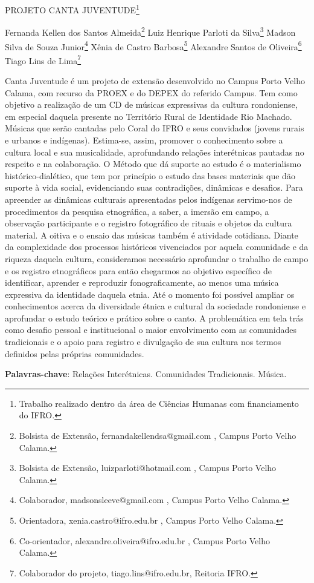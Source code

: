 \documentclass[article,12pt,onesidea,4paper,english,brazil]{abntex2}
\begin{document}
	
	
	\frenchspacing 
	
	\begin{center}
		\LARGE PROJETO CANTA JUVENTUDE\footnote{Trabalho realizado dentro da área de Ciências Humanas com financiamento do IFRO.}
		
		\normalsize
		Fernanda Kellen dos Santos Almeida\footnote{Bolsista de Extensão, fernandakellendsa@gmail.com , Campus Porto Velho Calama.} 
		Luiz Henrique Parloti da Silva\footnote{Bolsista de Extensão, luizparloti@hotmail.com , Campus Porto Velho Calama.} 
		Madson Silva de Souza Junior\footnote{Colaborador, madsonsleeve@gmail.com , Campus Porto Velho Calama.} 
		Xênia de Castro Barbosa\footnote{Orientadora, xenia.castro@ifro.edu.br , Campus Porto Velho Calama.} 
		Alexandre Santos de Oliveira\footnote{Co-orientador, alexandre.oliveira@ifro.edu.br , Campus Porto Velho Calama.}
		Tiago Lins de Lima\footnote{ Colaborador do projeto, tiago.lins@ifro.edu.br, Reitoria IFRO.}
	\end{center}
	
	\noindent Canta Juventude é um projeto de extensão desenvolvido no Campus Porto Velho Calama, com recurso da PROEX e do DEPEX do referido Campus. Tem como objetivo a realização de um CD de músicas expressivas da cultura rondoniense, em especial daquela presente no Território Rural de Identidade Rio Machado. Músicas que serão cantadas pelo Coral do IFRO e seus convidados (jovens rurais e urbanos e indígenas). Estima-se, assim, promover o conhecimento sobre a cultura local e sua musicalidade, aprofundando relações interétnicas pautadas no respeito e na colaboração. O Método que dá suporte ao estudo é o materialismo histórico-dialético, que tem por princípio o estudo das bases materiais que dão suporte à vida social, evidenciando suas contradições, dinâmicas e desafios. Para apreender as dinâmicas culturais apresentadas pelos indígenas servimo-nos de procedimentos da pesquisa etnográfica, a saber, a imersão em campo, a observação participante e o registro fotográfico de rituais e objetos da cultura material. A oitiva e o ensaio das músicas também é atividade cotidiana. Diante da complexidade dos processos históricos vivenciados por aquela comunidade e da riqueza daquela cultura, consideramos necessário aprofundar o trabalho de campo e os registro etnográficos para então chegarmos ao objetivo específico de identificar, aprender e reproduzir fonograficamente, ao menos uma música expressiva da identidade daquela etnia. Até o momento foi possível ampliar os conhecimentos acerca da diversidade étnica e cultural da sociedade rondoniense e aprofundar o estudo teórico e prático sobre o canto. A problemática em tela trás como desafio pessoal e institucional o maior envolvimento com as comunidades tradicionais e o apoio para registro e divulgação de sua cultura nos termos definidos pelas próprias comunidades.
	
	\vspace{\onelineskip}
	
	\noindent
	\textbf{Palavras-chave}: Relações Interétnicas. Comunidades Tradicionais. Música.
	
\end{document}
